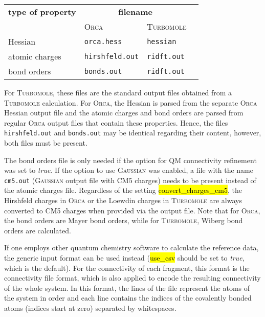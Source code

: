 \documentclass[]{tufte-book}
\begin{document}
{\renewcommand{\arraystretch}{1.3}
\begin{table}[h!]
\flushleft
\begin{tabular}{p{3.5cm}lll}
\hline \hline
\textbf{type of property} & \multicolumn{2}{c}{\textbf{filename}}      \\
                  & \textsc{Orca}                                                               & \textsc{Turbomole} &                      \\
\hline
Hessian           & \texttt{orca.hess                                                 } & \texttt{hessian}                        \\
atomic charges    & \texttt{hirshfeld.out} & \texttt{ridft.out}  \\ 
bond orders             &  \texttt{bonds.out}  & \texttt{ridft.out} \\
\hline
\hline
\end{tabular}
\end{table}
{\renewcommand{\arraystretch}{1.0}
\bigskip

For \textsc{Turbomole}, these files are the standard output files obtained from a \textsc{Turbomole} calculation. For \textsc{Orca}, the Hessian is parsed from the separate \textsc{Orca} Hessian output file and the atomic charges and bond orders are parsed from regular \textsc{Orca} output files that contain these properties. Hence, the files \texttt{hirshfeld.out} and \texttt{bonds.out} may be identical regarding their content, however, both files must be present.

The bond orders file is only needed if the option for QM connectivity refinement was set to \textit{true}. If the option to use \textsc{Gaussian} was enabled, a file with the name \texttt{cm5.out} (\textsc{Gaussian} output file with CM5 charges) needs to be present instead of the atomic charges file. 
Regardless of the setting \hl{convert\_charges\_cm5}, the Hirshfeld charges in \textsc{Orca} or the Loewdin charges in \textsc{Turbomole} are always converted to CM5 charges when provided via the output file.
Note that for \textsc{Orca}, the bond orders are Mayer bond orders, while for \textsc{Turbomole}, Wiberg bond orders are calculated.


If one employs other quantum chemistry software to calculate the reference data, the generic input format can be used instead (\hl{use\_csv} should be set to \textit{true}, which is the default). For the connectivity of each fragment, this format is the connectivity file format, which is also applied to encode the resulting connectivity of the whole system. In this format, the lines of the file represent the atoms of the system in order and each line contains the indices of the covalently bonded atoms (indices start at zero) separated by whitespaces.

}}
\end{document}
